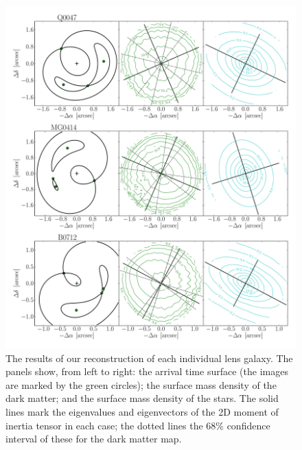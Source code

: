 \documentclass[useAMS,usenatbib]{mn2e}
\begin{document}
\begin{figure}
  \centering
  \includegraphics[width=.8\linewidth]{Figures/AllLenses31.pdf}
  \caption[width=.65\linewidth]{The results of our reconstruction of each individual lens galaxy. The panels show, from left to right: the arrival time surface (the images are marked by the green circles); the surface mass density of the dark matter; and the surface mass density of the stars. The solid lines mark the eigenvalues and eigenvectors of the 2D moment of inertia tensor in each case; the dotted lines the 68\% confidence interval of these for the dark matter map.}
  \label{fig:lensreconstruction1}
\end{figure}
\end{document}
